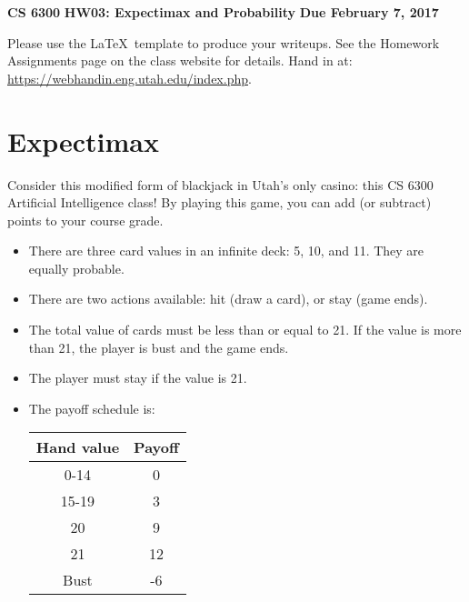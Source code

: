 \documentclass[12pt]{article}
\begin{document}
\begin{center}
{\bf CS 6300} \hfill {\large\bf HW03: Expectimax and Probability} \hfill {\bf Due February 7, 2017}
\end{center}

Please use the \LaTeX\ template to produce your writeups. See the
Homework Assignments page on the class website for details.  Hand in
at: \url{https://webhandin.eng.utah.edu/index.php}.

\section{Expectimax}

Consider this modified form of blackjack in Utah's only casino: this
CS 6300 Artificial Intelligence class!  By playing this game, you
can add (or subtract) points to your course grade.

\begin{itemize}

\item There are three card values in an infinite deck: 5, 10, and 11.
  They are equally probable.

\item There are two actions available: hit (draw a card), or stay
  (game ends).

\item The total value of cards must be less than or equal to 21.  If
  the value is more than 21, the player is bust and the game ends.

\item The player must stay if the value is 21.

\item The payoff schedule is:

      \begin{center}
      \begin{tabular}{c|c}\hline
        Hand value & Payoff \\ \hline
        0-14       & 0      \\
        15-19      & 3      \\
        20         & 9      \\
        21         & 12     \\
        Bust       & -6     \\ \hline
      \end{tabular}
      \end{center}

\end{itemize}
\end{document}
